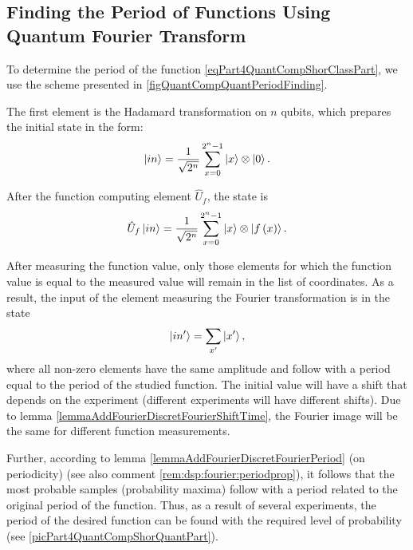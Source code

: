 \subsection{Finding the Period of Functions Using Quantum Fourier Transform}

To determine the period of the function \eqref{eqPart4QuantCompShorClassPart}, we use the scheme presented in \autoref{figQuantCompQuantPeriodFinding}.



The first element is the Hadamard transformation on $n$ qubits,  which prepares the initial state in the form:
\begin{equation}
\ket{in} = \frac{1}{\sqrt{2^n}}\sum_{x=0}^{2^n - 1} \ket{x} \otimes\ket{0}.
\nonumber
\end{equation}

After the function computing element $\hat{U}_f$, the state is
\begin{equation}
\hat{U}_f\ket{in} = \frac{1}{\sqrt{2^n}}\sum_{x=0}^{2^n - 1} \ket{x} \otimes\left|f\left(x\right)\right>.
\nonumber
\end{equation} 



After measuring the function value, only those elements for which the function value is equal to the measured value will remain in the list of coordinates. As a result, the input of the element measuring the Fourier transformation is in the state
\begin{equation}
\ket{in'} = \sum_{x'} \ket{x'},
\nonumber
\end{equation}
where all non-zero elements have the same amplitude and follow with a period equal to the period of the studied function. The initial value will have a shift that depends on the experiment (different experiments will have different shifts). Due to lemma \ref{lemmaAddFourierDiscretFourierShiftTime}, the Fourier image will be the same for different function measurements.

Further, according to lemma \ref{lemmaAddFourierDiscretFourierPeriod} (on periodicity) (see also comment \ref{rem:dsp:fourier:periodprop}), it follows that the most probable samples (probability maxima) follow with a period related to the original period of the function. Thus, as a result of several experiments, the period of the desired function can be found with the required level of probability (see \autoref{picPart4QuantCompShorQuantPart}).

